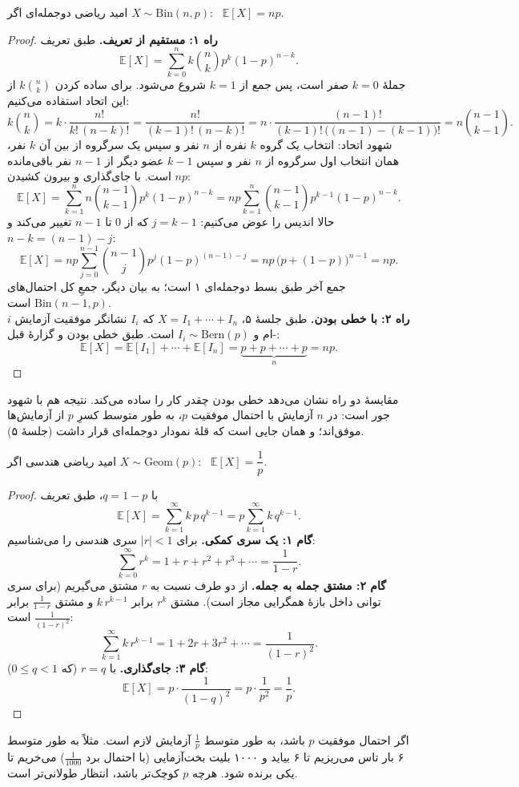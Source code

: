 \begin{proposition}[label=prop:E-bin]{امید ریاضی دوجمله‌ای}
  اگر $X\sim\mathrm{Bin}(n,p)$: \ $\mathbb E[X]=np$.
\end{proposition}
\begin{proof}
  \textbf{راه ۱: مستقیم از تعریف.} طبق تعریف
  \[ \mathbb E[X]=\sum_{k=0}^{n}k\binom nkp^k(1-p)^{n-k}. \]
  جملهٔ $k=0$ صفر است، پس جمع از $k=1$ شروع می‌شود. برای ساده کردن $k\binom nk$ از این اتحاد استفاده می‌کنیم:
  \[ k\binom nk=k\cdot\frac{n!}{k!\,(n-k)!}=\frac{n!}{(k-1)!\,(n-k)!}=n\cdot\frac{(n-1)!}{(k-1)!\,\bigl((n-1)-(k-1)\bigr)!}=n\binom{n-1}{k-1}. \]
  شهود اتحاد: انتخاب یک گروه $k$ نفره از $n$ نفر و سپس یک سرگروه از بین آن $k$ نفر، همان انتخاب اول سرگروه از $n$ نفر و سپس $k-1$ عضو دیگر از $n-1$ نفر باقی‌مانده است. \newline با جای‌گذاری و بیرون کشیدن $np$:
  \[ \mathbb E[X]=\sum_{k=1}^{n}n\binom{n-1}{k-1}p^k(1-p)^{n-k}=np\sum_{k=1}^{n}\binom{n-1}{k-1}p^{k-1}(1-p)^{n-k}. \]
  حالا اندیس را عوض می‌کنیم: $j=k-1$ که از $0$ تا $n-1$ تغییر می‌کند و $n-k=(n-1)-j$:
  \[ \mathbb E[X]=np\sum_{j=0}^{n-1}\binom{n-1}{j}p^{j}(1-p)^{(n-1)-j}=np\,\bigl(p+(1-p)\bigr)^{n-1}=np. \]
  جمع آخر طبق بسط دوجمله‌ای ۱ است؛ به بیان دیگر، جمعِ کل احتمال‌های $\mathrm{Bin}(n-1,p)$ است.\\[3pt]
  \textbf{راه ۲: با خطی بودن.} طبق جلسهٔ ۵، $X=I_1+\cdots+I_n$ که $I_i$ نشانگر موفقیت آزمایش $i$-ام و $I_i\sim\mathrm{Bern}(p)$ است. طبق خطی بودن و گزارهٔ قبل:
  \[ \mathbb E[X]=\mathbb E[I_1]+\cdots+\mathbb E[I_n]=\underbrace{p+p+\cdots+p}_{n}=np. \]
\end{proof}
مقایسهٔ دو راه نشان می‌دهد خطی بودن چقدر کار را ساده می‌کند. نتیجه هم با شهود جور است: در $n$ آزمایش با احتمال موفقیت $p$، به طور متوسط کسرِ $p$ از آزمایش‌ها موفق‌اند؛ و همان جایی است که قلهٔ نمودار دوجمله‌ای قرار داشت (جلسهٔ ۵).

\begin{proposition}[label=prop:E-geom]{امید ریاضی هندسی}
  اگر $X\sim\mathrm{Geom}(p)$: \ $\mathbb E[X]=\dfrac1p$.
\end{proposition}
\begin{proof}
  با $q=1-p$، طبق تعریف
  \[ \mathbb E[X]=\sum_{k=1}^{\infty}k\,p\,q^{k-1}=p\sum_{k=1}^{\infty}k\,q^{k-1}. \]
  \textbf{گام ۱: یک سری کمکی.} برای $|r|<1$ سری هندسی را می‌شناسیم:
  \[ \sum_{k=0}^{\infty}r^k=1+r+r^2+r^3+\cdots=\frac{1}{1-r}. \]
  \textbf{گام ۲: مشتق جمله به جمله.} از دو طرف نسبت به $r$ مشتق می‌گیریم (برای سری توانی داخل بازهٔ همگرایی مجاز است). مشتق $r^k$ برابر $k\,r^{k-1}$ و مشتق $\frac1{1-r}$ برابر $\frac{1}{(1-r)^2}$ است:
  \[ \sum_{k=1}^{\infty}k\,r^{k-1}=1+2r+3r^2+\cdots=\frac{1}{(1-r)^2}. \]
  \textbf{گام ۳: جای‌گذاری.} با $r=q$ (که $0\le q<1$):
  \[ \mathbb E[X]=p\cdot\frac{1}{(1-q)^2}=p\cdot\frac{1}{p^2}=\frac1p. \]
\end{proof}
اگر احتمال موفقیت $p$ باشد، به طور متوسط $\frac1p$ آزمایش لازم است. مثلاً به طور متوسط ۶ بار تاس می‌ریزیم تا ۶ بیاید و ۱۰۰۰ بلیت بخت‌آزمایی (با احتمال برد $\frac1{1000}$) می‌خریم تا یکی برنده شود. هرچه $p$ کوچک‌تر باشد، انتظار طولانی‌تر است.

